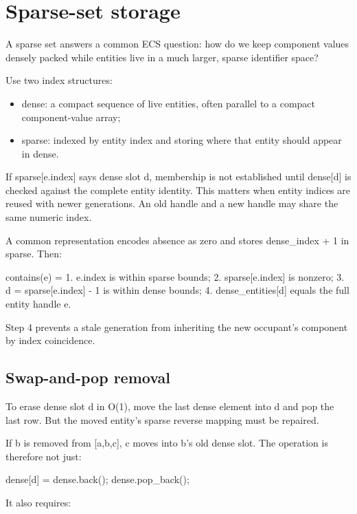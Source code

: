 \hypertarget{appendix-8404d0b1a3e7}{}
\section{Sparse-set storage}\label{appendix-8404d0b1a3e7-sparse-set-storage}

A sparse set answers a common ECS question: how do we keep component values densely packed while entities live in a much larger, sparse identifier space?

Use two index structures:

\begin{itemize}
\tightlist
\item
  dense: a compact sequence of live entities, often parallel to a compact component-value array;
\item
  sparse: indexed by entity index and storing where that entity should appear in dense.
\end{itemize}

If sparse{[}e.index{]} says dense slot d, membership is not established until dense{[}d{]} is checked against the complete entity identity. This matters when entity indices are reused with newer generations. An old handle and a new handle may share the same numeric index.

A common representation encodes absence as zero and stores dense\_index + 1 in sparse. Then:

contains(e) = 1. e.index is within sparse bounds; 2. sparse{[}e.index{]} is nonzero; 3. d = sparse{[}e.index{]} - 1 is within dense bounds; 4. dense\_entities{[}d{]} equals the full entity handle e.

Step 4 prevents a stale generation from inheriting the new occupant's component by index coincidence.

\subsection{Swap-and-pop removal}\label{appendix-8404d0b1a3e7-swap-and-pop-removal}

To erase dense slot d in O(1), move the last dense element into d and pop the last row. But the moved entity's sparse reverse mapping must be repaired.

If b is removed from {[}a,b,c{]}, c moves into b's old dense slot. The operation is therefore not just:

dense{[}d{]} = dense.back(); dense.pop\_back();

It also requires:

